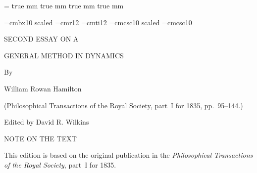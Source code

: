 %

\magnification=
 true mm  true mm
    true mm  true mm

\def\folio{\ifnum\pageno>0 \number\pageno \else
   \ifnum\pageno<0 \romannumeral-\pageno \else\fi\fi}

\font\Largebf=cmbx10  scaled 
\font\largerm=cmr12
\font\largeit=cmti12
\font\largesc=cmcsc10  scaled 
\font\sc=cmcsc10

\def\multieqalign#1{\null\,\vcenter{\openup1\jot \mathsurround=0pt
   \ialign{\strut\hfil$\displaystyle{##}$&$\displaystyle{{}##}$\hfil
   &&\quad \strut\hfil$\displaystyle{##}$&$\displaystyle{{}##}$\hfil
    \crcr#1\crcr}}\,}

\def\sum{\mathop{\Sigma}\nolimits}

\def\sectiontitle{\it\noindent}


\null\vskip72pt

\centerline{\Largebf SECOND ESSAY ON A}

\vskip12pt

\centerline{\Largebf GENERAL METHOD IN DYNAMICS}

\vskip24pt

\centerline{\Largebf By}

\vskip24pt

\centerline{\Largebf William Rowan Hamilton}

\vskip24pt

\centerline{\largerm (Philosophical Transactions of the Royal Society,
   part~I for 1835, pp.\ 95--144.)}

\vskip36pt

\vfill

\centerline{\largerm Edited by David R. Wilkins}

\vskip 12pt

\centerline{}

\vskip36pt\eject


\null\vskip36pt

\centerline{\Largebf NOTE ON THE TEXT}

\bigskip

This edition is based on the original publication in the {\it
Philosophical Transactions of the Royal Society}, part~I for
1835.

